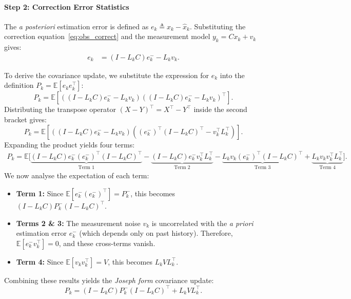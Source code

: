 \paragraph{Step 2: Correction Error Statistics}

The \textit{a posteriori} estimation error is defined as $e_k \triangleq x_k - \hat{x}_k$.
Substituting the correction equation~\eqref{eq:obs_correct} and the measurement model $y_k = C x_k + v_k$ gives:
\begin{align*}
	e_k 
	&= (I - L_k C)e_k^- - L_k v_k.
\end{align*}

To derive the covariance update, we substitute the expression for $e_k$ into the definition $P_k = \mathbb{E}[e_k e_k^\top ]$:
\begin{equation*}
	P_k = \mathbb{E}\left[ \left( (I - L_k C)e_k^- - L_k v_k \right) \left( (I - L_k C)e_k^- - L_k v_k \right)^\top  \right].
\end{equation*}
Distributing the transpose operator $(X - Y)^\top  = X^\top  - Y^\top $ inside the second bracket gives:
\begin{equation*}
	P_k = \mathbb{E}\left[ \left( (I - L_k C)e_k^- - L_k v_k \right) \left( (e_k^-)^\top (I - L_k C)^\top - v_k^\top  L_k^\top \right) \right].
\end{equation*}
Expanding the product yields four terms:
\begin{align*}
	P_k = \mathbb{E}\bigg[ 
	\underbrace{(I - L_k C) e_k^- (e_k^-)^\top (I - L_k C)^\top}_{\text{Term 1}} 
	- \underbrace{(I - L_k C) e_k^- v_k^\top L_k^\top}_{\text{Term 2}} 
	- \underbrace{L_k v_k (e_k^-)^\top (I - L_k C)^\top}_{\text{Term 3}} 
	+ \underbrace{L_k v_k v_k^\top L_k^\top}_{\text{Term 4}} 
	\bigg].
\end{align*}
We now analyse the expectation of each term:
\begin{itemize}
	\item \textbf{Term 1:} Since $\mathbb{E}[e_k^- (e_k^-)^\top] = P_k^-$, this becomes $(I - L_k C) P_k^- (I - L_k C)^\top$.
	\item \textbf{Terms 2 \& 3:} The measurement noise $v_k$ is uncorrelated with the \textit{a priori} estimation error $e_k^-$ (which depends only on past history). Therefore, $\mathbb{E}[e_k^- v_k^\top] = 0$, and these cross-terms vanish.
	\item \textbf{Term 4:} Since $\mathbb{E}[v_k v_k^\top] = V$, this becomes $L_k V L_k^\top$.
\end{itemize}
Combining these results yields the \emph{Joseph form} covariance update:
\begin{equation} \label{eq:cov_update_long}
	P_k = (I - L_k C) P_k^- (I - L_k C)^\top + L_k V L_k^\top.
\end{equation}

